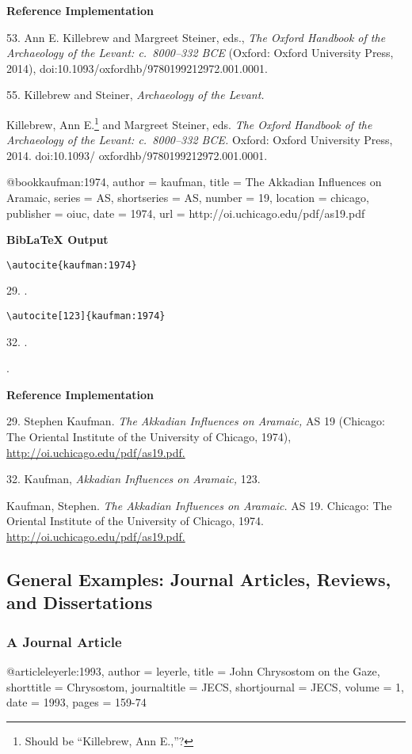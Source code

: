 \documentclass[a4paper]{article}
\newcommand\citetestnpf[4]{%
  {\textbf{BibLaTeX Output}\par
   \nobreak
   \texttt{\textbackslash autocite\{#4\}}\par
   \color{biblatex-colour}
   #1. \cite{#4}.\par
   \color{black}
   \texttt{\textbackslash autocite[#3]\{#4\}}\par
   \color{biblatex-colour}
   #2. \cite[#3]{#4}.\par
   \hangindent\bibindent\bibentrycite{#4}.\par}}
\newenvironment{refimp}{%
  \begin{minipage}{\linewidth}
    \setlength{\parskip}{1ex}
    \textbf{Reference Implementation}\par
    \nobreak
    \color{reference-colour}
}{\end{minipage}}
\newenvironment{vb}{%
  \setlength{\parskip}{0pt}
  \verbatim}{\endverbatim}
\begin{document}
\begin{refimp}
  53. Ann E. Killebrew and Margreet Steiner, eds., \emph{The Oxford Handbook
  of the Archaeology of the Levant: c.~8000–332 BCE} (Oxford: Oxford
  University Press, 2014), doi:10.1093/oxfordhb/9780199212972.001.0001.

  55. Killebrew and Steiner, \emph{Archaeology of the Levant.}

  \hangindent\bibindent Killebrew, Ann E.\footnote{Should be “Killebrew, Ann
  E.,”?} and Margreet Steiner, eds. \emph{The Oxford Handbook of the
  Archaeology of the Levant: c.~8000–332 BCE.} Oxford: Oxford University
  Press, 2014. doi:10.1093/ oxfordhb/9780199212972.001.0001.
\end{refimp}

\begin{vb}
@book{kaufman:1974,
  author = kaufman,
  title = {The Akkadian Influences on Aramaic},
  series = AS,
  shortseries = {AS},
  number = {19},
  location = chicago,
  publisher = oiuc,
  date = {1974},
  url = {http://oi.uchicago.edu/pdf/as19.pdf}
}
\end{vb}

\citetestnpf{29}{32}{123}{kaufman:1974}

\begin{refimp}
  29. Stephen Kaufman. \emph{The Akkadian Influences on Aramaic,} AS 19
  (Chicago: The Oriental Institute of the University of Chicago, 1974),
  \url{http://oi.uchicago.edu/pdf/as19.pdf.}

  32. Kaufman, \emph{Akkadian Influences on Aramaic,} 123.

  \hangindent\bibindent Kaufman, Stephen. \emph{The Akkadian Influences on
  Aramaic.} AS 19. Chicago: The Oriental Institute of the University of
  Chicago, 1974. \url{http://oi.uchicago.edu/pdf/as19.pdf.}
\end{refimp}

\subsection{General Examples: Journal Articles, Reviews, and Dissertations}

\subsubsection{A Journal Article}

\begin{vb}
@article{leyerle:1993,
  author = leyerle,
  title = {John Chrysostom on the Gaze},
  shorttitle = {Chrysostom},
  journaltitle = JECS,
  shortjournal = {JECS},
  volume = {1},
  date = {1993},
  pages = {159-74}
}
\end{vb}  
\end{document}
